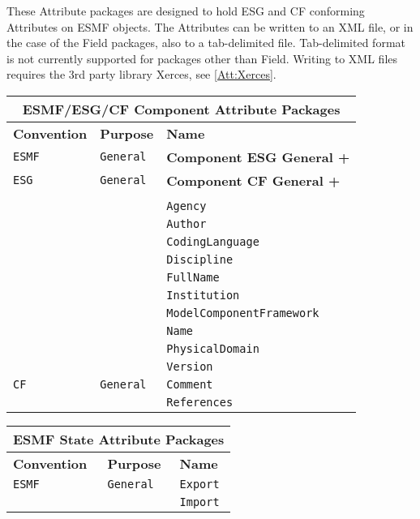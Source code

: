 These Attribute packages are designed to hold ESG and CF conforming Attributes on ESMF objects. The Attributes can be written to an XML file, or in the case of the Field packages, also to a tab-delimited file.  Tab-delimited format is not currently supported for packages other than Field.  Writing to XML files requires the 3rd party library Xerces, see \ref{Att:Xerces}.

\vspace{5pt}
\label{ComponentAttributePackages}
\begin{tabular}{|p{4cm}|p{4cm}|p{6cm}|}
\hline
\multicolumn{3}{|c|}{{\bf \large ESMF/ESG/CF Component Attribute Packages}} \\
\hline\hline
{\bf Convention} & {\bf Purpose} & {\bf Name} \\
\hline\hline
{\tt ESMF} & {\tt General} & {\bf Component ESG General +} \\
{\tt ESG} & {\tt General} & {\bf Component CF General +} \\
     & & \\
     & & {\tt Agency} \\
     & & {\tt Author} \\
     & & {\tt CodingLanguage}  \\
     & & {\tt Discipline}  \\
     & & {\tt FullName} \\
     & & {\tt Institution} \\
     & & {\tt ModelComponentFramework} \\
     & & {\tt Name} \\
     & & {\tt PhysicalDomain}\\
     & & {\tt Version} \\ 
\hline
{\tt CF} & {\tt General} & {\tt Comment}\\
     & & {\tt References} \\
\hline
\end{tabular}

\vspace{5pt}
\label{StateAttributePackages}
\begin{tabular}{|p{4cm}|p{4cm}|p{6cm}|}
\hline
\multicolumn{3}{|c|}{{\bf \large ESMF State Attribute Packages}} \\
\hline\hline
{\bf Convention} & {\bf Purpose} & {\bf Name} \\
\hline\hline
{\tt ESMF} & {\tt General} & {\tt Export}  \\
 & & {\tt Import} \\ 
\hline
\end{tabular}

